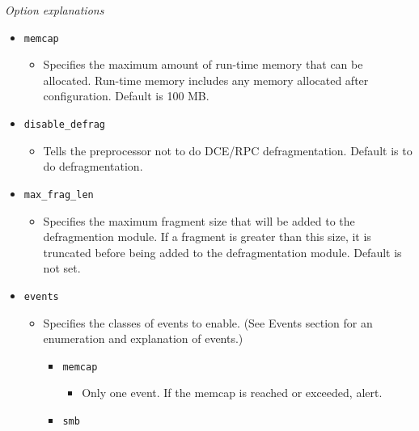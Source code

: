 \documentclass[english]{report}
\begin{document}
\textit{Option explanations}
\begin{itemize}
\item[] \texttt{memcap}
\begin{itemize}

\item[] Specifies the maximum amount of run-time memory that can be allocated.
Run-time memory includes any memory allocated after configuration.  Default is
100 MB.

\end{itemize}

\item[] \texttt{disable\_defrag}

\begin{itemize}

\item[] Tells the preprocessor not to do DCE/RPC defragmentation.  Default is
to do defragmentation.

\end{itemize}

\item[] \texttt{max\_frag\_len}

\begin{itemize}

\item[] Specifies the maximum fragment size that will be added to the
defragmention module. If a fragment is greater than this size, it is truncated
before being added to the defragmentation module.  Default is not set.

\end{itemize}

\item[] \texttt{events}

\begin{itemize}

\item[] Specifies the classes of events to enable.  (See Events section for an
enumeration and explanation of events.)

\begin{itemize}
\item[] \texttt{memcap}

\begin{itemize}
\item[] Only one event. If the memcap is reached or exceeded, alert.

\end{itemize}

\item[] \texttt{smb}


\end{itemize}
\end{itemize}
\end{itemize}
\end{document}
